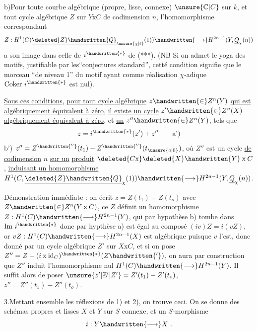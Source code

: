 b)\quad Pour toute courbe algébrique (propre, lisse, connexe) $\unsure{\mathbb{C}|C}$ sur $k$, et tout cycle algébrique $Z$ sur $Y\mathbin{\mathrm{x}}C$ de codimension $n$, l'homomorphisme correspondant
\[
Z:H^1(C)\underline{\deleted{Z}\handwritten{Q}}_{\unsure{\chi|\ell}}(1))\handwritten{\longrightarrow}H^{2n-1}(Y,\underline{Q}_{\chi}(n))
\]
a son image dans celle de $i^{\handwritten{*}}$ de (***). (NB Si on admet le yoga des motifs, justifiable par les``conjectures standard'', cetté condition signifie que le  morceau  ``de niveau 1'' du motif  ayant comme réalisation $\chi$-adique $\mathrm{Coker}\ i^{\handwritten{*}}$ est nul).

\uline{Sous ces conditions}, \uline{pour tout cycle algébrique} $z\handwritten{\in}Z^n(Y)$ \uline{qui est algébriquement équivalent à zéro}, \uline{il existe un cycle} $z'\handwritten{\in}Z^n(X)$ \uline{algébriquement équivalent à zéro}, et \uline{un} $z''\handwritten{\in}Z^n(Y)$, tels que
\[
z=i^{\handwritten{*}}(z')+z''\tag*{a')}
\]
b')\quad {} $z''=Z^{\handwritten{''}}(t_1)-Z^{\handwritten{''}}(t_{\unsure{o|0}})$, où $Z''$ est un cycle \uline{de codimension} $n$ \uline{sur un} \uline{produit} $\deleted{C\mathbin{\mathrm{x}}}\deleted{X}\handwritten{Y}\mathbin{\mathrm{x}}C$, \uline{induisant un homomorphisme}   $H^1(C,\underline{\deleted{Z}\handwritten{Q}}_{\chi}(1))\handwritten{\longrightarrow}H^{2n-1}(Y,\underline{Q}_{\chi}(n))$.

Démonstration immédiate : on écrit $z=Z(t_1)-Z(t_o)$ avec $Z\handwritten{\in}Z^n(Y\mathbin{\mathrm{x}}C)$, ce $Z$ définit un homomorphisme $Z:H^1(C)\handwritten{\longrightarrow}H^{2n-1}(Y)$,  qui par hypothèse b) tombe dans $\mathrm{Im}\ i^{\handwritten{*}}$ donc par hypthèse a) est égal au composé $(iv)Z=i(vZ)$, or $vZ:H^1(C)\handwritten{\longrightarrow}H^{2n-1}(X)$ est algébrique puisque $v$ l'est, donc donné par un cycle algébrique $Z'$ sur $X\mathbin{\mathrm{x}}C$, et si on pose $Z''=Z-(i\mathbin{\mathrm{x}}\mathrm{id}_C)^{\handwritten{*}}(Z\handwritten{'} )$, on aura par construction que $Z''$ induit l'homomorphisme nul $H^1(C)\handwritten{\longrightarrow}H^{2n-1}(Y)$.  Il suffit alors de poser $\unsure{z'|\mathbb{Z}'|Z'}=Z'(t_1)-Z'(t_o)$, $z''=Z''(t_1)-Z''(t_o)$.

3.\quad Mettant ensemble les réflexions de 1) et 2), on trouve ceci. On se donne des schémas propres et lisses $X$ et $Y$ sur $S$  connexe, et un $S$-morphisme
\[
i:Y\handwritten{\longrightarrow}X\ .
\]
